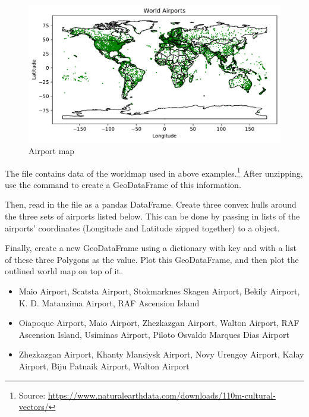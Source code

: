 \begin{figure}[H]
\begin{center}
\includegraphics[scale=.7]{figures/airports.pdf}
\end{center}
\label{airport-map}
\caption{Airport map}
\end{figure}

\begin{problem}
The file  contains data of the worldmap used in above examples.\footnote{Source: \url{https://www.naturalearthdata.com/downloads/110m-cultural-vectors/}}
After unzipping, use the command  to create a GeoDataFrame of this information.

Then, read in the file  as a pandas DataFrame.
Create three convex hulls around the three sets of airports listed below.
This can be done by passing in lists of the airports' coordinates (Longitude and Latitude zipped together) to a  object.

Finally, create a new GeoDataFrame using a dictionary with key  and with a list of these three Polygons as the value.
Plot this GeoDataFrame, and then plot the outlined world map on top of it.

\begin{itemize} %
	\item Maio Airport, Scatsta Airport, Stokmarknes Skagen Airport, Bekily Airport, K. D. Matanzima Airport, RAF Ascension Island
	\item Oiapoque Airport, Maio Airport, Zhezkazgan Airport, Walton Airport, RAF Ascension Island, Usiminas Airport, Piloto Osvaldo Marques Dias Airport
	\item Zhezkazgan Airport, Khanty Mansiysk Airport, Novy Urengoy Airport, Kalay Airport, Biju Patnaik Airport, Walton Airport
\end{itemize}
\end{problem}

